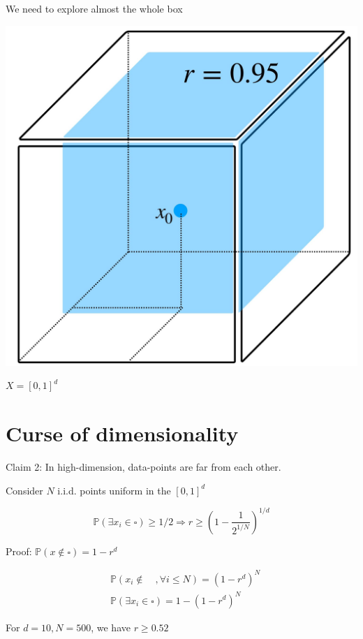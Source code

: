 \documentclass[10pt]{article}
\begin{document}
We need to explore almost the whole box

\begin{center}
\includegraphics[max width=\textwidth]{2023_12_30_f937b0007b5d87b39f79g-26}
\end{center}

$X=[0,1]^{d}$

\section*{Curse of dimensionality}
Claim 2: In high-dimension, data-points are far from each other.

Consider $N$ i.i.d. points uniform in the $[0,1]^{d}$

$$
\mathbb{P}\left(\exists x_{i} \in \square\right) \geq 1 / 2 \Longrightarrow r \geq\left(1-\frac{1}{2^{1 / N}}\right)^{1 / d}
$$

Proof: $\mathbb{P}(x \notin \square)=1-r^{d}$

$$
\begin{aligned}
& \mathbb{P}\left(x_{i} \notin \quad, \forall i \leq N\right)=\left(1-r^{d}\right)^{N} \\
& \mathbb{P}\left(\exists x_{i} \in \square\right)=1-\left(1-r^{d}\right)^{N}
\end{aligned}
$$

For $d=10, N=500$, we have $r \geq 0.52$
\end{document}
